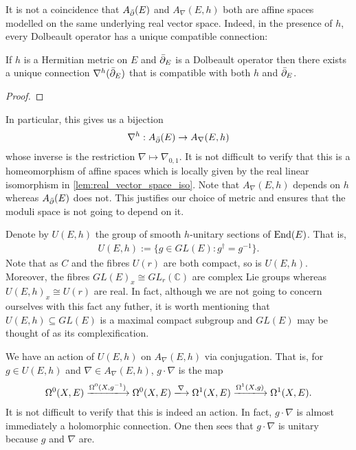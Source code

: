 \documentclass[12pt]{ociamthesis}  %
\begin{document}
It is not a coincidence that $A_{\bar{\partial}} (E)$ and $A_\nabla(E,h)$ both are
affine spaces modelled on the same underlying real vector space.
Indeed, in the presence of $h$, every Dolbeault operator has a unique
compatible connection:

\begin{theorem}\label{thm:chern_connection}
  If $h$ is a Hermitian metric on $E$ and ${\bar{\partial}}_E$ is a Dolbeault
  operator then there exists a unique connection $\nabla^h({\bar{\partial}}_E)$
  that is compatible with both $h$ and ${\bar{\partial}}_E$.
  \begin{proof}
    \missingproof
  \end{proof}
\end{theorem}

In particular, this gives us a bijection
\begin{align}\label{eq:chern_correspondence}
  \nabla^h : A_{\bar{\partial}} (E) \to A_\nabla(E,h)
\end{align}
whose inverse is the restriction
$\nabla \mapsto \nabla_{0,1}$. It is not difficult to verify that this
is a homeomorphism of affine spaces which is locally given by
the real linear isomorphism in \ref{lem:real_vector_space_iso}.
Note that $A_\nabla(E,h)$ depends on $h$ whereas $A_{{\bar{\partial}}}(E)$ does
not. This justifies our choice of metric and ensures that the
moduli space is not going to depend on it.

Denote by $U(E,h)$ the group of smooth $h$-unitary sections of $\operatorname{End}(E)$.
That is,
\begin{align*}
  U(E,h) := \{g \in GL(E) : g^\dagger = g^{-1}\}.
\end{align*}
Note that as $C$ and the fibres $U(r)$ are both compact,
so is $U(E,h)$. Moreover, the fibres $GL(E)_x \cong GL_r(\mathbb C)$
are complex Lie groups whereas $U(E,h)_x\cong U(r)$ are real.
In fact, although we are not going to concern ourselves with this
fact any futher, it is worth mentioning that $U(E,h)\subseteq GL(E)$
is a maximal compact subgroup and $GL(E)$ may be thought of as its
complexification.

We have an action of $U(E,h)$ on $A_\nabla(E,h)$ via conjugation. That is,
for $g\in U(E,h)$ and $\nabla\in A_\nabla(E,h)$, $g\cdot\nabla$ is the map
\begin{align*}
  \Omega^0(X,E) \xlongrightarrow{\Omega^0(X,{g}^{-1})}
  \Omega^0(X,E) \xlongrightarrow{\nabla}
  \Omega^1(X,E) \xlongrightarrow{\Omega^1(X,g)}
  \Omega^1(X,E).
\end{align*}
It is not difficult to verify that this is indeed an action.
In fact, $g\cdot\nabla$ is almost immediately a holomorphic connection.
One then sees that $g\cdot\nabla$ is unitary because
$g$ and $\nabla$ are.
\end{document}
